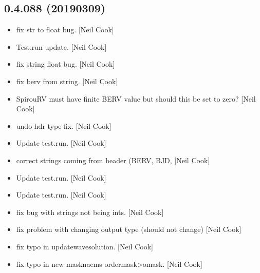 \documentclass[a4paper,10pt,english]{report}
\begin{document}
\subsection{0.4.088 (2019\sphinxhyphen{}03\sphinxhyphen{}09)}
\label{\detokenize{misc/changelog:id192}}\begin{itemize}
\item {} 
 \sphinxhyphen{} fix str to float bug. {[}Neil Cook{]}

\item {} 
Test.run \sphinxhyphen{} update. {[}Neil Cook{]}

\item {} 
 \sphinxhyphen{} fix string \sphinxhyphen{} float bug. {[}Neil Cook{]}

\item {} 
 \sphinxhyphen{}fix berv from string. {[}Neil Cook{]}

\item {} 
SpirouRV \sphinxhyphen{} must have finite BERV value \textendash{} but should this be set to
zero? {[}Neil Cook{]}

\item {} 
 \sphinxhyphen{} undo hdr type fix. {[}Neil Cook{]}

\item {} 
Update test.run. {[}Neil Cook{]}

\item {} 
 \sphinxhyphen{} correct strings coming from header (BERV, BJD,
 {[}Neil Cook{]}

\item {} 
Update test.run. {[}Neil Cook{]}

\item {} 
Update test.run. {[}Neil Cook{]}

\item {} 
 \sphinxhyphen{} fix bug with strings not being ints. {[}Neil Cook{]}

\item {} 
 \sphinxhyphen{} fix problem with changing output type (should not
change) {[}Neil Cook{]}

\item {} 
 \sphinxhyphen{} fix typo in updatewavesolution. {[}Neil Cook{]}

\item {} 
 \sphinxhyphen{} fix typo in new masknaems ordermask\textendash{}\textgreater{}omask. {[}Neil
Cook{]}


\end{itemize}
\end{document}
